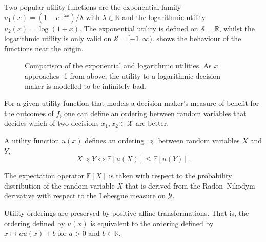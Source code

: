 \documentclass[main.tex]{subfiles}
\begin{document}
\begin{example}
  Two popular utility functions are the exponential family
  $u_1(x)=(1-e^{-\lambda x})/\lambda$ with $\lambda\in\mathbb{R}$ and the logarithmic
  utility $u_2(x)=\log(1+x)$.
  The exponential utility is defined on $\mathcal{S} =\mathbb{R}$,
  whilst the logarithmic utility is only valid on
  $\mathcal{S}=[-1,\infty)$.
   shows the behaviour of the functions
  near the origin.
  \begin{figure}[htbp]
    \centering
    \caption[Comparison of the exponential and logarithmic utilities]{Comparison of the exponential and logarithmic
      utilities. As $x$ approaches -1 from above, the utility to a logarithmic
      decision maker is modelled to be infinitely bad.
    }\label{fig:example_utilities}
  \end{figure}
\end{example}

For a given utility function that models a decision maker's measure of
benefit for the outcomes of $f$, one can define an ordering
between random variables that decides which of two decisions
$x_1,x_2\in\mathcal{X}$ are better.
\begin{mydef}
  A utility function $u(x)$ defines an ordering $\preceq$ between random
  variables $X$ and $Y$,
  \begin{equation}
    X\preceq Y \Leftrightarrow \mathbb{E}[u(X)] \leq \mathbb{E}[u(Y)].
  \end{equation}
\end{mydef}
The expectation operator $\mathbb{E}[X]$ is taken with respect to the
probability distribution of the random variable $X$ that is derived
from the Radon--Nikodym derivative with respect to the
Lebesgue measure on $\mathcal{Y}$.

\begin{remark}
  Utility orderings are preserved by positive affine transformations.
  That is, the ordering defined by $u(x)$ is equivalent to the
  ordering defined by $x\mapsto au(x)+b$ for  $a>0$ and $b\in\mathbb{R}$.
\end{remark}
\end{document}
